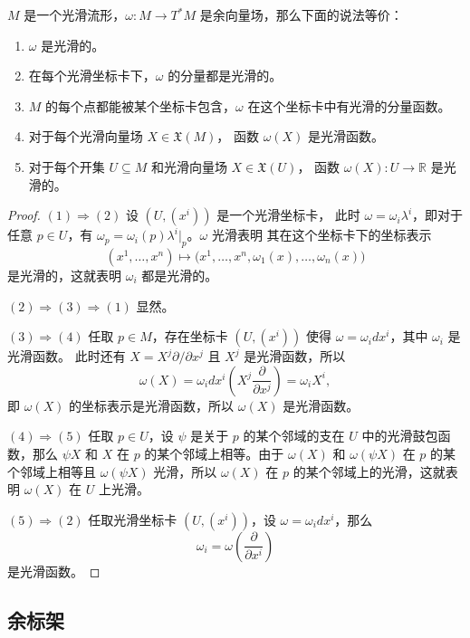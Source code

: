 \begin{proposition}[余向量场的光滑性判别]
  $M$ 是一个光滑流形，$\omega:M\to T^*M$ 是余向量场，那么下面的说法等价：
  \begin{enumerate}
    \item $\omega$ 是光滑的。
    \item 在每个光滑坐标卡下，$\omega$ 的分量都是光滑的。
    \item $M$ 的每个点都能被某个坐标卡包含，$\omega$ 在这个坐标卡中有光滑的分量函数。
    \item 对于每个光滑向量场 $X\in \mathfrak{X}(M)$，
    函数 $\omega(X)$ 是光滑函数。
    \item 对于每个开集 $U\subseteq M$ 和光滑向量场 $X\in \mathfrak{X}(U)$，
    函数 $\omega(X):U\to \mathbb{R}$ 是光滑的。
  \end{enumerate}
\end{proposition}
\begin{proof}
  $(1)\Rightarrow (2)$ 设 $(U,(x^i))$ 是一个光滑坐标卡，
  此时 $\omega=\omega_i\lambda^i$，即对于任意 $p\in U$，有
  $\omega_p=\omega_i(p)\lambda^i|_p$。$\omega$ 光滑表明
  其在这个坐标卡下的坐标表示
  \[
    (x^1,\dots,x^n)\mapsto \bigl(x^1,\dots,x^n,\omega_1(x),\dots,\omega_n(x)\bigr)
  \]
  是光滑的，这就表明 $\omega_i$ 都是光滑的。

  $(2)\Rightarrow (3)\Rightarrow (1)$ 显然。

  $(3)\Rightarrow (4)$ 任取 $p\in M$，存在坐标卡 $(U,(x^i))$ 使得 $\omega=\omega_idx^i$，其中 $\omega_i$ 是光滑函数。
  此时还有 $X=X^j\partial/\partial x^j$ 且 $X^j$ 是光滑函数，所以
  \[
    \omega (X)=\omega_idx^i\left(X^j\frac{\partial}{\partial x^j}\right)=\omega_iX^i,
  \]
  即 $\omega(X)$ 的坐标表示是光滑函数，所以 $\omega(X)$ 是光滑函数。

  $(4)\Rightarrow (5)$ 任取 $p\in U$，设 $\psi$ 是关于 $p$ 的某个邻域的支在 $U$ 中的光滑鼓包函数，那么 $\psi X$
  和 $X$ 在 $p$ 的某个邻域上相等。由于 $\omega(X)$ 和 $\omega(\psi X)$ 在 $p$ 的某个邻域上相等且
  $\omega(\psi X)$ 光滑，所以 $\omega(X)$ 在 $p$ 的某个邻域上的光滑，这就表明 $\omega(X)$ 在 $U$ 上光滑。

  $(5)\Rightarrow (2)$ 任取光滑坐标卡 $(U,(x^i))$，设 $\omega=\omega_idx^i$，那么
  \[
    \omega_i=\omega\left(\frac{\partial}{\partial x^i }\right)
  \]
  是光滑函数。
\end{proof}

\subsection{余标架}

